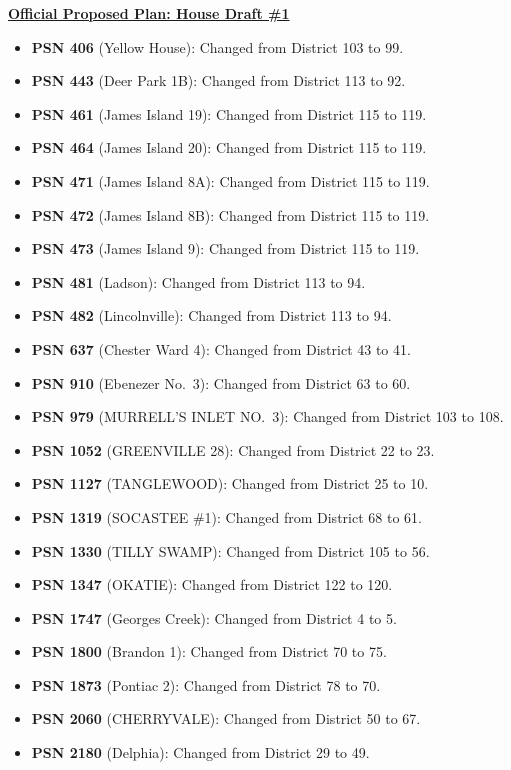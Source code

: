 \documentclass[11pt]{article}
\begin{document}
\underline{\textbf{Official Proposed Plan: House Draft \#1}}
\begin{itemize}
	\item \textbf{PSN 406} (Yellow House): Changed from District 103 to 99.
	\item \textbf{PSN 443} (Deer Park 1B): Changed from District 113 to 92.
	\item \textbf{PSN 461} (James Island 19): Changed from District 115 to 119.
	\item \textbf{PSN 464} (James Island 20): Changed from District 115 to 119.
	\item \textbf{PSN 471} (James Island 8A): Changed from District 115 to 119.
	\item \textbf{PSN 472} (James Island 8B): Changed from District 115 to 119.
	\item \textbf{PSN 473} (James Island 9): Changed from District 115 to 119.
	\item \textbf{PSN 481} (Ladson): Changed from District 113 to 94.
	\item \textbf{PSN 482} (Lincolnville): Changed from District 113 to 94.
	\item \textbf{PSN 637} (Chester Ward 4): Changed from District 43 to 41.
	\item \textbf{PSN 910} (Ebenezer No.\ 3): Changed from District 63 to 60.
	\item \textbf{PSN 979} (MURRELL’S INLET NO.\ 3): Changed from District 103 to 108.
	\item \textbf{PSN 1052} (GREENVILLE 28): Changed from District 22 to 23.
	\item \textbf{PSN 1127} (TANGLEWOOD): Changed from District 25 to 10.
	\item \textbf{PSN 1319} (SOCASTEE \#1): Changed from District 68 to 61.
	\item \textbf{PSN 1330} (TILLY SWAMP): Changed from District 105 to 56.
	\item \textbf{PSN 1347} (OKATIE): Changed from District 122 to 120.
	\item \textbf{PSN 1747} (Georges Creek): Changed from District 4 to 5.
	\item \textbf{PSN 1800} (Brandon 1): Changed from District 70 to 75.
	\item \textbf{PSN 1873} (Pontiac 2): Changed from District 78 to 70.
	\item \textbf{PSN 2060} (CHERRYVALE): Changed from District 50 to 67.
	\item \textbf{PSN 2180} (Delphia): Changed from District 29 to 49.
\end{itemize}
\end{document}
